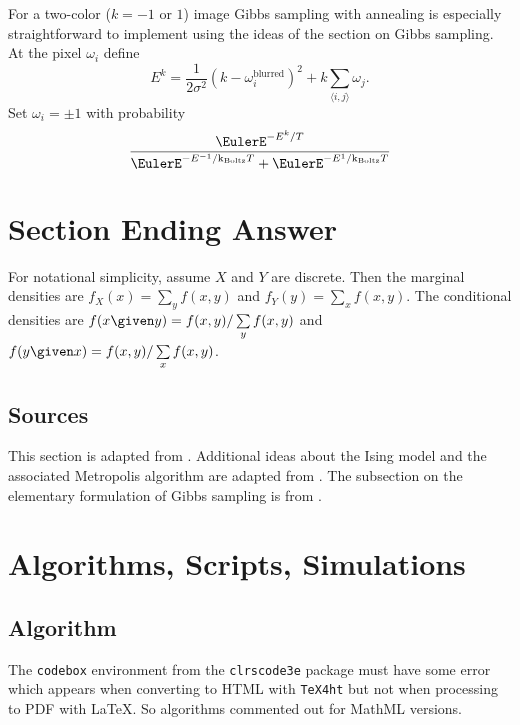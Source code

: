 \documentclass[12pt]{article}
\newcommand{\kT}{{\text k}_{\text{Boltz}}T}
\begin{document}
For a two-color ($k = -1$ or $1$) image Gibbs sampling with annealing is especially straightforward
to implement using the ideas of the section on Gibbs sampling.  At the
pixel $\omega_i$ define
\[
    E^k = \frac{1}{2 \sigma^2}( k - \omega_i^{\text{blurred}})^2 + k
    \sum\limits_{\langle i,j\rangle} \omega_j.
  \]
  Set $\omega_i = \pm 1$ with probability
  \[
    \frac{\EulerE^{-E^k/T}}{\EulerE^{-E^{-1}/\kT} + \EulerE^{-E^1/\kT}}
  \]
  
\section*{Section Ending Answer}

For notational simplicity, assume \( X \) and \( Y \) are discrete.
Then the marginal densities are \( f_X(x) = \sum\limits_y f(x,y) \) and \(
f_Y(y) = \sum_x f(x,y) \).  The conditional densities are \( f(x \given
y) = f(x,y)/\sum\limits_y f(x,y) \) and \( f(y \given x) = f(x,y)/\sum\limits_x
f(x,y) \).

\subsection*{Sources}

This section is adapted from
\cite{richey10}.  Additional ideas about the Ising model and the
associated Metropolis algorithm are adapted from
\cite{schlusser18}.  The subsection on the elementary formulation of
Gibbs sampling is from
\cite{casella92}.

\hr

\section*{Algorithms, Scripts, Simulations}

\subsection*{Algorithm}

The \texttt{codebox} environment from the \texttt{clrscode3e} package
must have some error which appears when converting to HTML with
\texttt{TeX4ht} but not when processing to PDF with \LaTeX.  So
algorithms commented out for MathML versions.
\end{document}
